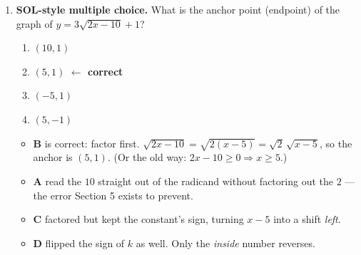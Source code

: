 \documentclass[10pt]{article}
\begin{document}
\begin{enumerate}[leftmargin=1.8em, itemsep=9pt]
        \vspace{4pt}
        \textbf{Equation:} $y=$ 

        \vspace{2pt}
        {\small\emph{Work:} $2=a\sqrt{5-1}-2 \Rightarrow 2=2a-2 \Rightarrow a=2$. \;
        Check $(10,4)$: $2\sqrt{9}-2=4$. \checkmark}

  \item \textbf{SOL-style multiple choice.} What is the anchor point (endpoint) of the graph of
        $y=3\sqrt{2x-10}+1$?
        \begin{enumerate}[label=\Alph*., leftmargin=1.9em, itemsep=1pt]
          \item $(10,1)$
          \item $(5,1)$ \quad \textcolor{keyred}{\textbf{$\leftarrow$ correct}}
          \item $(-5,1)$
          \item $(5,-1)$
        \end{enumerate}
        \vspace{2pt}
        \begin{itemize}[leftmargin=1.4em, nosep]
          \item \textbf{B} is correct: factor first. $\sqrt{2x-10}=\sqrt{2(x-5)}=\sqrt2\,\sqrt{x-5}$,
                so the anchor is $(5,1)$. (Or the old way: $2x-10\ge0 \Rightarrow x\ge5$.)
          \item \textbf{A} read the $10$ straight out of the radicand without factoring out the
                $2$ --- the error Section 5 exists to prevent.
          \item \textbf{C} factored but kept the constant's sign, turning $x-5$ into a shift
                \emph{left}.
          \item \textbf{D} flipped the sign of $k$ as well. Only the \emph{inside} number reverses.
        \end{itemize}
\end{enumerate}
\end{document}
